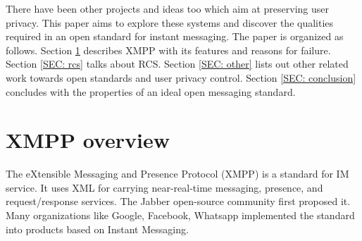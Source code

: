 \documentclass[11pt, conference, a4paper]{IEEEtran}
\begin{document}
\par
There have been other projects and ideas too which aim at preserving user privacy. This paper aims to explore these systems and discover the qualities required in an open standard for instant messaging.
The paper is organized as follows. Section \ref{SEC: xmpp-overview} describes XMPP with its features and reasons for failure. Section \ref{SEC: rcs} talks about RCS. Section \ref{SEC: other} lists out other related work towards open standards and user privacy control. Section \ref{SEC: conclusion} concludes with the properties of an ideal open messaging standard. 



\section{XMPP overview}
\label{SEC: xmpp-overview}
The eXtensible Messaging and Presence Protocol (XMPP) is a standard for IM service. It uses XML for carrying near-real-time messaging, presence, and request/response services. The Jabber open-source community first proposed it. Many organizations like Google, Facebook, Whatsapp implemented the standard into products based on Instant Messaging.
\end{document}
